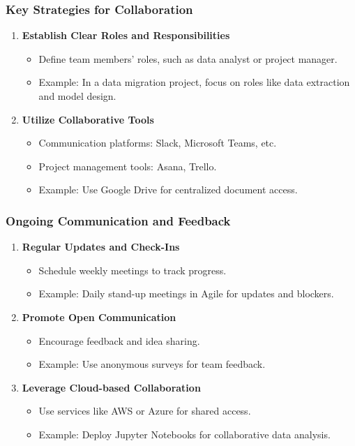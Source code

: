 \documentclass[aspectratio=169]{beamer}
\begin{document}
\begin{frame}[fragile]
  \frametitle{Key Strategies for Collaboration}
  \begin{enumerate}
    \item \textbf{Establish Clear Roles and Responsibilities}
      \begin{itemize}
        \item Define team members' roles, such as data analyst or project manager.
        \item Example: In a data migration project, focus on roles like data extraction and model design.
      \end{itemize}
    
    \item \textbf{Utilize Collaborative Tools}
      \begin{itemize}
        \item Communication platforms: Slack, Microsoft Teams, etc.
        \item Project management tools: Asana, Trello.
        \item Example: Use Google Drive for centralized document access.
      \end{itemize}
  \end{enumerate}
\end{frame}

\begin{frame}[fragile]
  \frametitle{Ongoing Communication and Feedback}
  \begin{enumerate}[resume]
    \item \textbf{Regular Updates and Check-Ins}
      \begin{itemize}
        \item Schedule weekly meetings to track progress.
        \item Example: Daily stand-up meetings in Agile for updates and blockers.
      \end{itemize}
      
    \item \textbf{Promote Open Communication}
      \begin{itemize}
        \item Encourage feedback and idea sharing.
        \item Example: Use anonymous surveys for team feedback.
      \end{itemize}

    \item \textbf{Leverage Cloud-based Collaboration}
      \begin{itemize}
        \item Use services like AWS or Azure for shared access.
        \item Example: Deploy Jupyter Notebooks for collaborative data analysis.
      \end{itemize}
  \end{enumerate}
\end{frame}
\end{document}
